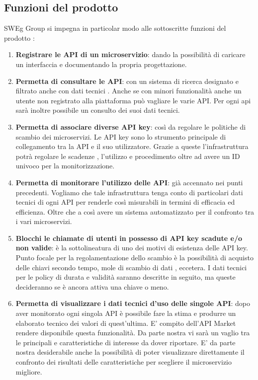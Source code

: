 \documentclass[12pt,a4paper,titlepage]{article}
\begin{document}
	\subsection{Funzioni del prodotto}
	SWEg Group si impegna in particolar modo alle sottoscritte funzioni del prodotto :
	\begin{enumerate}
		\item \textbf{Registrare le API di un microservizio}:	dando la possibilità di caricare un interfaccia e documentando la propria progettazione.
		\item \textbf{Permetta di consultare le API}:	con un sistema di ricerca designato e filtrato anche con dati tecnici . Anche se con minori funzionalità anche un utente non registrato alla piattaforma può vagliare le varie API. Per ogni api sarà inoltre possibile un consulto dei suoi dati tecnici.
		\item \textbf{Permetta di associare diverse API key}: così da regolare le politiche di scambio dei microservizi. Le API key sono lo strumento principale di collegamento tra la API e il suo utilizzatore. Grazie a queste l'infrastruttura potrà regolare le scadenze , l'utilizzo e procedimento oltre ad avere un ID univoco per la monitorizzazione. 
		\item \textbf{Permetta di monitorare l'utilizzo delle API}:	già accennato nei punti precedenti. Vogliamo che tale infrastruttura tenga conto di particolari dati tecnici di ogni API per renderle così misurabili in termini di efficacia ed efficienza. Oltre che a così avere un sistema automatizzato per il confronto tra i vari microservizi.
		\item \textbf{Blocchi le chiamate di utenti in possesso di API key scadute e/o non valide}:	è la sottolineatura di uno dei motivi di esistenza delle API key. Punto focale per la regolamentazione dello scambio è la possibilità di acquisto delle chiavi secondo tempo, mole di scambio di dati , eccetera. I dati tecnici per le policy di durata e validità saranno descritte in seguito, ma queste decideranno se è ancora attiva una chiave o meno.
		\item \textbf{Permetta di visualizzare i dati tecnici d'uso delle singole API}:	dopo aver monitorato ogni singola API è possibile fare la stima e produrre un elaborato tecnico dei valori di quest'ultima. E' compito dell'API Market rendere disponibile questa funzionalità. Da parte nostra vi sarà un vaglio tra le principali e caratteristiche di interesse da dover riportare. E' da parte nostra desiderabile anche la possibilità di poter visualizzare direttamente il confronto dei risultati delle caratteristiche per scegliere il microservizio migliore.

\end{enumerate}
\end{document}
